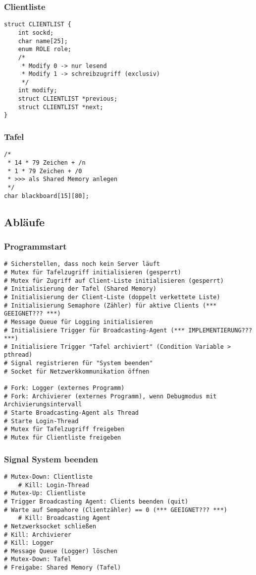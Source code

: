 \subsubsection{Clientliste}
\begin{lstlisting}
struct CLIENTLIST {
    int sockd;
    char name[25];
    enum ROLE role;
    /*
     * Modify 0 -> nur lesend
     * Modify 1 -> schreibzugriff (exclusiv)
     */
    int modify;
    struct CLIENTLIST *previous;
    struct CLIENTLIST *next;
}
\end{lstlisting}

\subsubsection{Tafel}
\begin{lstlisting}
/* 
 * 14 * 79 Zeichen + /n
 * 1 * 79 Zeichen + /0
 * >>> als Shared Memory anlegen
 */
char blackboard[15][80];
\end{lstlisting}

\subsection{Abläufe}

\subsubsection{Programmstart}
\begin{lstlisting}
# Sicherstellen, dass noch kein Server läuft
# Mutex für Tafelzugriff initialisieren (gesperrt)
# Mutex für Zugriff auf Client-Liste initialisieren (gesperrt)
# Initialisierung der Tafel (Shared Memory)
# Initialisierung der Client-Liste (doppelt verkettete Liste)
# Initialisierung Semaphore (Zähler) für aktive Clients (*** GEEIGNET??? ***)
# Message Queue für Logging initialisieren
# Initialisiere Trigger für Broadcasting-Agent (*** IMPLEMENTIERUNG??? ***)
# Initialisiere Trigger "Tafel archiviert" (Condition Variable > pthread)
# Signal registrieren für "System beenden"
# Socket für Netzwerkkommunikation öffnen

# Fork: Logger (externes Programm)
# Fork: Archivierer (externes Programm), wenn Debugmodus mit Archivierungsintervall
# Starte Broadcasting-Agent als Thread
# Starte Login-Thread
# Mutex für Tafelzugriff freigeben
# Mutex für Clientliste freigeben
\end{lstlisting}

\subsubsection{Signal System beenden}
\begin{lstlisting}
# Mutex-Down: Clientliste
    # Kill: Login-Thread
# Mutex-Up: Clientliste
# Trigger Broadcasting Agent: Clients beenden (quit)
# Warte auf Sempahore (Clientzähler) == 0 (*** GEEIGNET??? ***)
    # Kill: Broadcasting Agent
# Netzwerksocket schließen
# Kill: Archivierer
# Kill: Logger
# Message Queue (Logger) löschen
# Mutex-Down: Tafel
# Freigabe: Shared Memory (Tafel)
\end{lstlisting}

